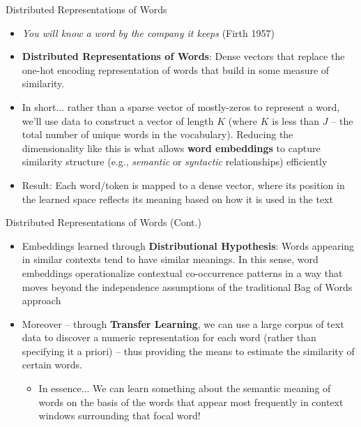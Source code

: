 \documentclass[
  ignorenonframetext,
  aspectratio=169]{beamer}
\begin{document}
\begin{frame}{Distributed Representations of Words}
\label{distributed-representations-of-words-1}
\begin{itemize}
\item \textit{You will know a word by the company it keeps} (Firth 1957) \par \vspace{2.5mm} \pause
\item \textbf{Distributed Representations of Words}: Dense vectors that replace the one-hot encoding representation of words that build in some measure of similarity. \par \vspace{2.5mm}
\item In short... rather than a sparse vector of mostly-zeros to represent a word, we’ll use data to construct a vector of length $K$ (where $K$ is less than $J$ – the total number of unique words in the vocabulary). Reducing the dimensionality like this is what allows \textbf{word embeddings} to capture similarity structure (e.g., \emph{semantic} or \emph{syntactic} relationships) efficiently \par \vspace{2.5mm} \pause
\item Result: Each word/token is mapped to a dense vector, where its position in the learned space reflects its meaning based on how it is used in the text
\end{itemize}
\end{frame}

\begin{frame}{Distributed Representations of Words (Cont.)}
\label{distributed-representations-of-words-cont.}
\begin{itemize}
\item Embeddings learned through \textbf{Distributional Hypothesis}: Words appearing in similar contexts tend to have similar meanings. In this sense, word embeddings operationalize contextual co-occurrence patterns in a way that moves beyond the independence assumptions of the traditional Bag of Words approach  \par \vspace{2.5mm} \pause
\item Moreover -- through \textbf{Transfer Learning}, we can use a large corpus of text data to discover a numeric representation for each word (rather than specifying it a priori) – thus providing the means to estimate the similarity of certain words. 
  \begin{itemize} \vspace{-1mm}
  \item In essence... We can learn something about the semantic meaning of words on the basis of the words that appear most frequently in context windows surrounding that focal word!
  \end{itemize}
\end{itemize}
\end{frame}
\end{document}
